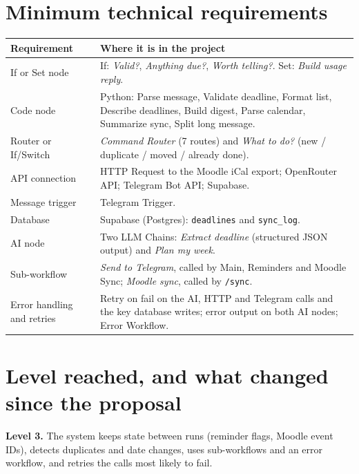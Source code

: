 \documentclass[10pt,a4paper]{article}
\newcommand{\cmd}[1]{\texttt{\small #1}}
\begin{document}
\section{Minimum technical requirements}

\renewcommand{\arraystretch}{1.2}
\begin{tabularx}{\linewidth}{@{}>{\raggedright\arraybackslash}p{3.4cm} X@{}}
\toprule
\textbf{Requirement} & \textbf{Where it is in the project} \\
\midrule
If or Set node & If: \emph{Valid?}, \emph{Anything due?}, \emph{Worth telling?}. Set: \emph{Build usage reply}. \\
Code node & Python: Parse message, Validate deadline, Format list, Describe deadlines, Build digest, Parse calendar,
Summarize sync, Split long message. \\
Router or If/Switch & \emph{Command Router} (7 routes) and \emph{What to do?} (new / duplicate / moved / already done). \\
API connection & HTTP Request to the Moodle iCal export; OpenRouter API; Telegram Bot API; Supabase. \\
Message trigger & Telegram Trigger. \\
Database & Supabase (Postgres): \cmd{deadlines} and \cmd{sync\_log}. \\
AI node & Two LLM Chains: \emph{Extract deadline} (structured JSON output) and \emph{Plan my week}. \\
Sub-workflow & \emph{Send to Telegram}, called by Main, Reminders and Moodle Sync; \emph{Moodle sync}, called by \cmd{/sync}. \\
Error handling and retries & Retry on fail on the AI, HTTP and Telegram calls and the key database writes; error output on both AI nodes; Error Workflow. \\
\bottomrule
\end{tabularx}

\section{Level reached, and what changed since the proposal}

\textbf{Level 3.} The system keeps state between runs (reminder flags, Moodle event IDs), detects duplicates and
date changes, uses sub-workflows and an error workflow, and retries the calls most likely to fail.
\end{document}
